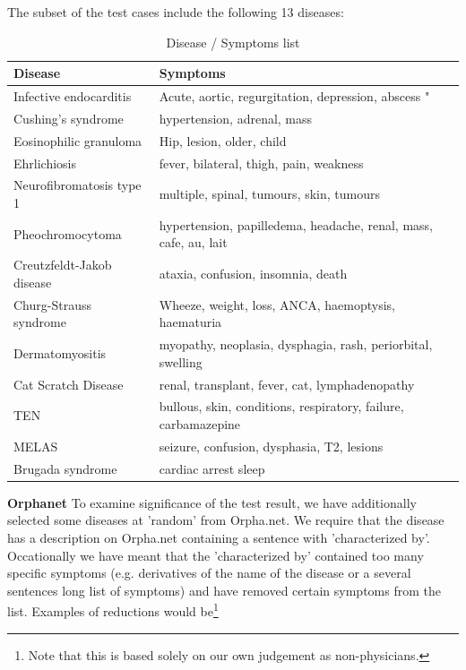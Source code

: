 The subset of the \cite{HangwiTang11102006} test cases include the
following 13 diseases:

\begin{table}[!h]
\caption{Disease / Symptoms list}
\begin{tabular}{|l|p{7cm}|}
\hline
Disease & Symptoms \\
\hline
Infective endocarditis & Acute, aortic,  regurgitation, depression,  abscess " \\
\hline
Cushing's syndrome & hypertension, adrenal, mass \\
\hline
Eosinophilic granuloma & Hip, lesion, older, child \\
\hline
Ehrlichiosis & fever, bilateral, thigh, pain, weakness \\
\hline
Neurofibromatosis type 1 & multiple, spinal, tumours, skin, tumours \\
\hline
Pheochromocytoma & hypertension, papilledema, headache, renal, mass, cafe, au, lait \\
\hline
Creutzfeldt-Jakob disease & ataxia, confusion, insomnia, death \\
\hline
Churg-Strauss syndrome & Wheeze, weight, loss, ANCA, haemoptysis, haematuria \\
\hline
Dermatomyositis & myopathy, neoplasia, dysphagia, rash, periorbital, swelling \\
\hline
Cat Scratch Disease & renal, transplant, fever, cat, lymphadenopathy \\
\hline
TEN & bullous, skin, conditions, respiratory, failure, carbamazepine \\
\hline
MELAS & seizure, confusion, dysphasia, T2, lesions \\
\hline
Brugada syndrome & cardiac arrest sleep \\
\hline
\end{tabular}
\end{table}

\textbf{Orphanet}
To examine significance of the test result, we have additionally selected some diseases at 'random' from Orpha.net. We require that the disease has a description on Orpha.net containing a sentence with 'characterized by'. Occationally we have meant that the 'characterized by' contained too many specific symptoms (e.g. derivatives of the name of the disease or a several sentences long list of symptoms) and have removed certain symptoms from the list. Examples of reductions would be\footnote{Note that this is based solely on our own judgement as non-physicians.} \\

